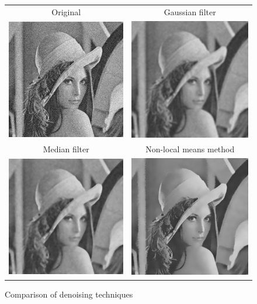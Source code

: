 \begin{figure}[t]
\centering
{\sffamily
\begin{tabular}{cc}
Original & Gaussian filter \\
\includegraphics[width=.4\linewidth]{img/preprocessing/denoise_orig.png}
&
\includegraphics[width=.4\linewidth]{img/preprocessing/denoise_gauss.png}
\vspace{1em} \\
Median filter & Non-local means method \\
\includegraphics[width=.4\linewidth]{img/preprocessing/denoise_median.png}
&
\includegraphics[width=.4\linewidth]{img/preprocessing/denoise_nonlocal.png}
\end{tabular}
}
\caption{Comparison of denoising techniques}
\label{fig:preprocessDenoising}
\end{figure}


